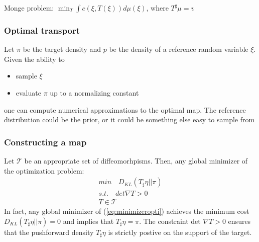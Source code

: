 \documentclass[table]{beamer}
\begin{document}
\begin{CJK}{UTF8}{gbsn}
\begin{frame}
Monge problem: $\min_{T} \int c(\xi,T(\xi)) d \mu (\xi)$, where $T^{\sharp} \mu = v$
\end{frame}
\begin{frame}
  \frametitle{Optimal transport}
Let $\pi$ be the target density and $p$ be the density of a reference random variable $\xi$.
Given the ability to
\begin{itemize}
\item sample $\xi$
\item evaluate $\pi$ up to a normalizing constant
\end{itemize}
one can compute numerical approximations to the optimal map.
\hfill
The reference distribution could be the prior, or it could be something else easy to sample from
\end{frame}
\begin{frame}
\frametitle{Constructing a map}

Let $\mathcal{T}$ be an appropriate set of diffeomorhpisms. Then, any global minimizer of the optimization problem:
\begin{equation}\label{eq:minimizeropti}
\begin{aligned}
min \quad D_{KL}(T_{\sharp}\eta || \pi)\\
s.t. \quad det \nabla T > 0 \\
T \in \mathcal{T}
\end{aligned}
\end{equation}
In fact, any global minimizer of (\ref{eq:minimizeropti}) achieves the minimum cost $D_{KL}(T_{\sharp}\eta || \pi)=0$ and implies that $T_{\sharp}\eta = \pi$. The constraint det $\nabla T >0$ ensures that the pushforward density $T_{\sharp}\eta$ is strictly postive on the support of the target.
\end{frame}


\end{CJK}
\end{document}
